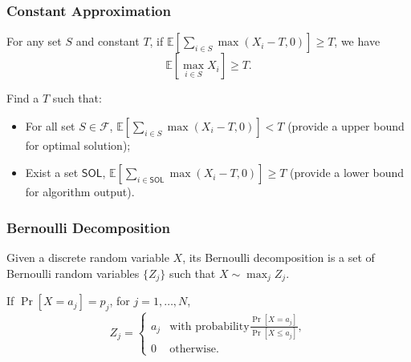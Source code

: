 \documentclass{beamer}
\newcommand{\calF}{{\mathcal F}}
\newcommand{\Exp}{{\mathbb{E}}}
\newcommand{\sol}{\mathsf{SOL}}
\begin{document}
\begin{frame}
    \frametitle{Constant Approximation}

    \begin{lemma}
        For any set $S$ and constant $T$, if $\Exp[\sum_{i\in S} \max(X_i - T, 0)] \geq T$, we have
        $$\Exp[\max_{i\in S} X_i] \geq T.$$
    \end{lemma}

    Find a $T$ such that:
    \begin{itemize}
        \item For all set $S\in \calF$, $\Exp[\sum_{i\in S} \max(X_i - T, 0)] < T$ (provide a upper bound for optimal solution);
        \item Exist a set $\sol$, $\Exp[\sum_{i\in \sol} \max(X_i - T, 0)] \geq T$ (provide a lower bound for algorithm output).
    \end{itemize}
\end{frame}

\begin{frame}
    \frametitle{Bernoulli Decomposition}
    \begin{definition}
        Given a discrete random variable $X$, its Bernoulli decomposition is a set of Bernoulli random variables $\{Z_j\}$ such that $X\sim \max_j Z_j$.
    \end{definition}
    If $\Pr[X = a_j] = p_j$, for $j = 1, \ldots, N$, 
    $$Z_j = \left\{
        \begin{array}{ll}
            a_j & \text{with probability} \frac{\Pr[X = a_j]}{\Pr[X \leq a_j]},\\
            0 & \text{otherwise}.
        \end{array}
        \right.
        $$
\end{frame}
\end{document}
